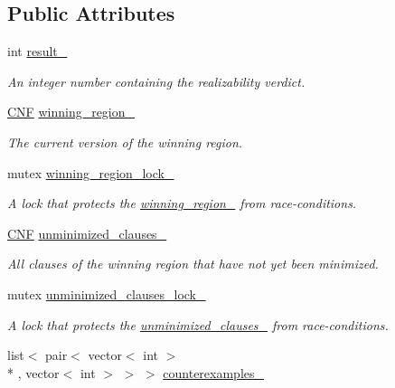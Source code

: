 \subsection*{Public Attributes}
\begin{DoxyCompactItemize}
\item 
int \hyperlink{classParallelLearner_a757f8817809cce5c0408cdc41d6db1b8}{result\-\_\-}
\begin{DoxyCompactList}\small\item\em An integer number containing the realizability verdict. \end{DoxyCompactList}\item 
\hyperlink{classCNF}{C\-N\-F} \hyperlink{classParallelLearner_a7c8383543ff98d7a0356a237756dcdd6}{winning\-\_\-region\-\_\-}
\begin{DoxyCompactList}\small\item\em The current version of the winning region. \end{DoxyCompactList}\item 
mutex \hyperlink{classParallelLearner_a196a4500dfd66a4b9110659b4a10dead}{winning\-\_\-region\-\_\-lock\-\_\-}
\begin{DoxyCompactList}\small\item\em A lock that protects the \hyperlink{classParallelLearner_a7c8383543ff98d7a0356a237756dcdd6}{winning\-\_\-region\-\_\-} from race-\/conditions. \end{DoxyCompactList}\item 
\hyperlink{classCNF}{C\-N\-F} \hyperlink{classParallelLearner_aba6b363071d9a39d7b368cec5b629c25}{unminimized\-\_\-clauses\-\_\-}
\begin{DoxyCompactList}\small\item\em All clauses of the winning region that have not yet been minimized. \end{DoxyCompactList}\item 
mutex \hyperlink{classParallelLearner_aa16d364d9fdd0c2fe5180ee1b023a4ec}{unminimized\-\_\-clauses\-\_\-lock\-\_\-}
\begin{DoxyCompactList}\small\item\em A lock that protects the \hyperlink{classParallelLearner_aba6b363071d9a39d7b368cec5b629c25}{unminimized\-\_\-clauses\-\_\-} from race-\/conditions. \end{DoxyCompactList}\item 
list$<$ pair$<$ vector$<$ int $>$\\*
, vector$<$ int $>$ $>$ $>$ \hyperlink{classParallelLearner_a974943e3e2145b3407f689b64acdd33f}{counterexamples\-\_\-}

\end{DoxyCompactItemize}
